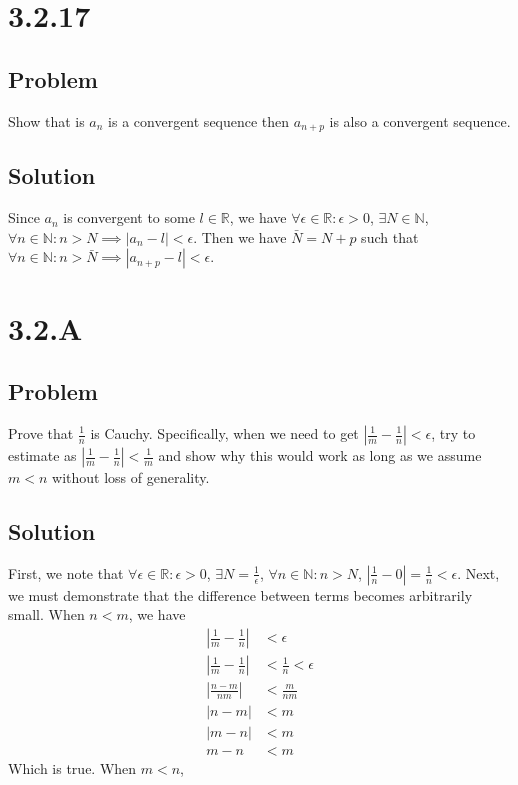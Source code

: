 \documentclass[12pt]{article}
\newcommand{\abs}  [1]{\left|       #1 \right|      }
\newcommand{\R}    [0]{\mathbb{R}                   }
\newcommand{\N}    [0]{\mathbb{N}                   }
\begin{document}
\section*{3.2.17}

\subsection*{Problem}
Show that is $a_n$ is a convergent sequence then $a_{n + p}$ is also a convergent sequence.

\subsection*{Solution}
Since $a_n$ is convergent to some $l \in \R$, we have $\forall \epsilon \in \R : \epsilon > 0$, $\exists N \in \N$, $\forall n \in \N : n > N \implies \abs{a_n - l} < \epsilon$. Then we have $\bar{N} = N + p$ such that $\forall n \in \N : n > \bar{N} \implies \abs{a_{n + p} - l} < \epsilon$.



\section*{3.2.A}

\subsection*{Problem}
Prove that $\frac{1}{n}$ is Cauchy. Specifically, when we need to get $\abs{\frac{1}{m} - \frac{1}{n}} < \epsilon$, try to estimate as $\abs{\frac{1}{m} - \frac{1}{n}} < \frac{1}{m}$ and show why this would work as long as we assume $m < n$ without loss of generality.

\subsection*{Solution}
First, we note that
$\forall \epsilon \in \R : \epsilon > 0$, $\exists N = \frac{1}{\epsilon}$, $\forall n \in \N : n > N$, $\abs{\frac{1}{n} - 0} = \frac{1}{n} < \epsilon$.
Next, we must demonstrate that the difference between terms becomes arbitrarily small. When $n < m$, we have
\begin{align*}
    \abs{\frac{1}{m} - \frac{1}{n}} &< \epsilon \\
    \abs{\frac{1}{m} - \frac{1}{n}} &< \frac{1}{n} < \epsilon \\
    \abs{\frac{n - m}{nm}} &< \frac{m}{nm} \\
    \abs{n - m} &< m \\
    \abs{m - n} &< m \\
    m - n &< m
\end{align*}
Which is true. When $m < n$,
\end{document}
